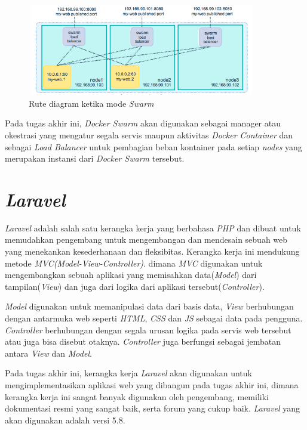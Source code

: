 			\begin{figure}[H]
				\centering
				\includegraphics[width=10cm,height=4cm]{Images/C-2/swarmdiagramroute.png}
				\caption{Rute diagram ketika mode \textit{Swarm}\cite{docker_swarm_route}}
				\label{swarmdiagramroute}
			\end{figure}
		
			\indent Pada tugas akhir ini, \textit{Docker Swarm} akan digunakan sebagai manager atau okestrasi yang mengatur segala servis maupun aktivitas \textit{Docker Container} dan sebagai \textit{Load Balancer} untuk pembagian beban kontainer pada setiap \textit{nodes} yang merupakan instansi dari \textit{Docker Swarm} tersebut.
			
			
		
	\section{\textit{Laravel}}
		\textit{Laravel} adalah salah satu kerangka kerja yang berbahasa \textit{PHP} dan dibuat untuk memudahkan pengembang untuk mengembangan dan mendesain sebuah web yang menekankan kesederhanaan dan fleksibitas. Kerangka kerja ini mendukung metode \textit{MVC(Model-View-Controller)}. dimana \textit{MVC} digunakan untuk mengembangkan sebuah aplikasi yang memisahkan data(\textit{Model}) dari tampilan(\textit{View}) dan juga dari logika dari aplikasi tersebut(\textit{Controller})\cite{laraveframework}.
		
		\indent \textit{Model} digunakan untuk memanipulasi data dari basis data, \textit{View} berhubungan dengan antarmuka web seperti \textit{HTML}, \textit{CSS} dan \textit{JS} sebagai data pada pengguna. \textit{Controller} berhubungan dengan segala urusan logika pada servis web tersebut atau juga bisa disebut otaknya. \textit{Controller} juga berfungsi sebagai jembatan antara \textit{View} dan \textit{Model}\cite{laraveframework}.
	
		\indent Pada tugas akhir ini, kerangka kerja \textit{Laravel} akan digunakan untuk mengimplementasikan aplikasi web yang dibangun pada tugas akhir ini, dimana kerangka kerja ini sangat banyak digunakan oleh pengembang, memiliki dokumentasi resmi yang sangat baik, serta forum yang cukup baik. \textit{Laravel} yang akan digunakan adalah versi 5.8.
		
